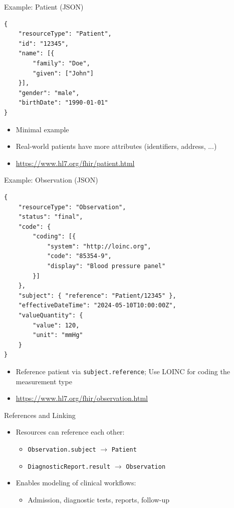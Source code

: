 \documentclass[aspectratio=1610]{beamer}
\begin{document}
	\begin{frame}[fragile]{Example: Patient (JSON)}
		\lstset{language=JSON}
		\begin{lstlisting}
{
	"resourceType": "Patient",
	"id": "12345",
	"name": [{
		"family": "Doe",
		"given": ["John"]
	}],
	"gender": "male",
	"birthDate": "1990-01-01"
}
		\end{lstlisting}
		\begin{itemize}
			\item Minimal example
			\item Real-world patients have more attributes (identifiers, address, ...)
			\item \url{https://www.hl7.org/fhir/patient.html}
		\end{itemize}
	\end{frame}
	
	\begin{frame}[fragile]{Example: Observation (JSON)}
		\lstset{language=JSON}
		\begin{lstlisting}
{
	"resourceType": "Observation",
	"status": "final",
	"code": {
		"coding": [{
			"system": "http://loinc.org",
			"code": "85354-9",
			"display": "Blood pressure panel"
		}]
	},
	"subject": { "reference": "Patient/12345" },
	"effectiveDateTime": "2024-05-10T10:00:00Z",
	"valueQuantity": {
		"value": 120,
		"unit": "mmHg"
	}
}
		\end{lstlisting}
		\begin{itemize}
			\item Reference patient via \texttt{subject.reference}; Use LOINC for coding the measurement type
			\item \url{https://www.hl7.org/fhir/observation.html}
		\end{itemize}
	\end{frame}
	
	\begin{frame}{References and Linking}
		\begin{itemize}
			\item Resources can reference each other:
			\begin{itemize}
				\item \texttt{Observation.subject} $\rightarrow$ \texttt{Patient}
				\item \texttt{DiagnosticReport.result} $\rightarrow$ \texttt{Observation}
			\end{itemize}
			\item Enables modeling of clinical workflows:
			\begin{itemize}
				\item Admission, diagnostic tests, reports, follow-up
			\end{itemize}
		\end{itemize}
	\end{frame}
	
\end{document}
